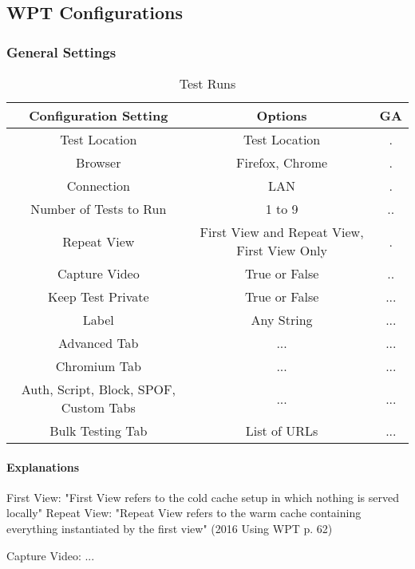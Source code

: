 


\subsection{WPT Configurations}


\subsubsection{General Settings}

\begin{table}[h]
	\caption[Test Runs]{Test Runs \cite{DBLP:books/infix/Schwarz99}}
	\label{tab:tamodelleVergleich}
	\centering
	\begin{tabular}{ c | c | c } 
	Configuration Setting & Options & GA \\
	\hline \hline
	Test Location & Test Location & . \\ 
	Browser & Firefox, Chrome & . \\
	\hline
	Connection & LAN & . \\
	Number of Tests to Run & 1 to 9 & .. \\
	Repeat View & First View and Repeat View, First View Only & . \\
	Capture Video & True or False & .. \\
	Keep Test Private & True or False & ... \\
	Label & Any String & ... \\
	\hline	  
	Advanced Tab & ... & ... \\
	Chromium Tab & ... & ... \\
	Auth, Script, Block, SPOF, Custom Tabs & ... & ... \\
	Bulk Testing Tab & List of URLs & ... \\
	\end{tabular}
\end{table}

\paragraph{Explanations}

First View: "First View refers to the cold cache setup in which nothing is served locally"
Repeat View: "Repeat View refers to the warm cache containing everything instantiated by the first view"
(2016 Using WPT p. 62)

Capture Video: ...

